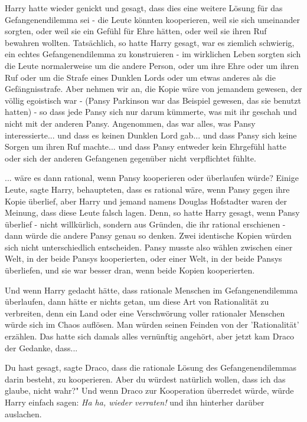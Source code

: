 Harry hatte wieder genickt und gesagt, dass dies eine weitere Lösung für das
Gefangenendilemma sei - die Leute könnten kooperieren, weil sie sich umeinander
sorgten, oder weil sie ein Gefühl für Ehre hätten, oder weil sie ihren Ruf
bewahren wollten. Tatsächlich, so hatte Harry gesagt, war es ziemlich schwierig,
ein echtes Gefangenendilemma zu konstruieren - im wirklichen Leben sorgten sich
die Leute normalerweise um die andere Person, oder um ihre Ehre oder um ihren
Ruf oder um die Strafe eines Dunklen Lords oder um etwas anderes als die
Gefängnisstrafe. Aber nehmen wir an, die Kopie wäre von jemandem gewesen, der
völlig egoistisch war - (Pansy Parkinson war das Beispiel gewesen, das sie
benutzt hatten) - so dass jede Pansy sich nur darum kümmerte, was mit ihr
geschah und nicht mit der anderen Pansy. Angenommen, das war alles, was Pansy
interessierte... und dass es keinen Dunklen Lord gab... und dass Pansy sich
keine Sorgen um ihren Ruf machte... und dass Pansy entweder kein Ehrgefühl hatte
oder sich der anderen Gefangenen gegenüber nicht verpflichtet fühlte.

... wäre es dann rational, wenn Pansy kooperieren oder überlaufen würde? Einige
Leute, sagte Harry, behaupteten, dass es rational wäre, wenn Pansy gegen ihre
Kopie überlief, aber Harry und jemand namens Douglas Hofstadter waren der
Meinung, dass diese Leute falsch lagen. Denn, so hatte Harry gesagt, wenn Pansy
überlief - nicht willkürlich, sondern aus Gründen, die ihr rational erschienen -
dann würde die andere Pansy genau so denken. Zwei identische Kopien würden sich
nicht unterschiedlich entscheiden. Pansy musste also wählen zwischen einer Welt,
in der beide Pansys kooperierten, oder einer Welt, in der beide Pansys
überliefen, und sie war besser dran, wenn beide Kopien kooperierten.

Und wenn Harry gedacht hätte, dass \glqq rationale\grqq{} Menschen im
Gefangenendilemma überlaufen, dann hätte er nichts getan, um diese Art von \glqq
Rationalität\grqq{} zu verbreiten, denn ein Land oder eine Verschwörung voller
\glqq rationaler\grqq{} Menschen würde sich im Chaos auflösen. Man würden seinen
Feinden von der 'Rationalität' erzählen. Das hatte sich damals alles vernünftig
angehört, aber jetzt kam Draco der Gedanke, dass...

\glqq Du hast gesagt\grqq{}, sagte Draco, \glqq dass die rationale Lösung des
Gefangenendilemmas darin besteht, zu kooperieren. Aber du würdest natürlich
wollen, dass ich das glaube, nicht wahr?" Und wenn Draco zur Kooperation
überredet würde, würde Harry einfach sagen: \emph{ \glqq Ha ha, wieder
verraten!\grqq{} } und ihn hinterher darüber auslachen.

